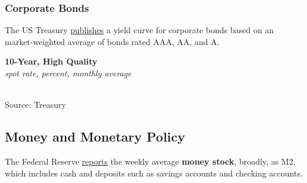 \documentclass{report}
\makeatletter
\newcommand{\tbllink}[1]{\href{https://raw.githubusercontent.com/bdecon/US-chartbook/master/chartbook/data/#1}{\faTable}}
\newcommand*\short[1]{\expandafter\@gobbletwo\number\numexpr#1\relax}
\newcommand{\shdateaxisticks}{
		date coordinates in=x, axis line style={draw=none},
		xmax={2021-02-01},
		max space between ticks=40,	    
		xtick={{1990-01-01}, {1995-01-01}, {2000-01-01}, 
			{2005-01-01}, {2010-01-01}, {2015-01-01}, {2020-01-01}},
		minor xtick={},
		enlarge y limits={0.06}, enlarge x limits={0.01},
		}
\newcommand{\bbar}[2]{extra #1 ticks = {{#2}}, extra #1 tick labels = ,
		extra #1 tick style = {grid=major, grid style={thick, black!25}},}
\newcommand{\stdline}[4]{\addplot[very thick, no markers, color=#1] 
		table [x=#2, y=#3, col sep=comma] {#4};	}
\newcommand{\rbars}{
		\fill[color=black!10] (axis cs:{1990-07-01},\pgfkeysvalueof{/pgfplots/ymin}) rectangle 
			(axis cs:{1991-03-01}, \pgfkeysvalueof{/pgfplots/ymax});
		\fill[color=black!10] (axis cs:{2007-12-01},\pgfkeysvalueof{/pgfplots/ymin}) rectangle 
			(axis cs:{2009-07-01}, \pgfkeysvalueof{/pgfplots/ymax});
		\fill[color=black!10] (axis cs:{2001-03-01},\pgfkeysvalueof{/pgfplots/ymin}) rectangle 
			(axis cs:{2001-11-01}, \pgfkeysvalueof{/pgfplots/ymax});}
\makeatother
\begin{document}
{{{{{{{{{\vspace{7mm}

\subsubsection*{\color{black!70} \seriffont Corporate Bonds}
\begin{minipage}{0.29\textwidth}
\small The US Treasury \href{https://www.treasury.gov/resource-center/economic-policy/corp-bond-yield/Pages/Corp-Yield-Bond-Curve-Papers.aspx}{publishes} a yield curve for corporate bonds based on an market-weighted average of bonds rated AAA, AA, and A.  \\
\end{minipage}\hspace{8mm} \begin{minipage}{0.41\textwidth}
\noindent \normalsize \textbf{10-Year, High Quality}\\
\footnotesize{\textit{spot rate, percent, monthly average}}\\ 
\noindent \hspace*{-2mm} \\
\footnotesize{Source: Treasury} \hfill \tbllink{hqcb.csv}\\
\end{minipage}



\newpage

\begin{minipage}{0.76\textwidth}

\subsection*{\color{black!70} \seriffont Money and Monetary Policy}

\small The Federal Reserve \href{https://www.federalreserve.gov/releases/h6/current/default.htm}{reports} the weekly average \textbf{money stock}, broadly, as M2, which includes cash and deposits such as savings accounts and checking accounts. \\


\end{minipage}}}}}}}}}}
\end{document}

